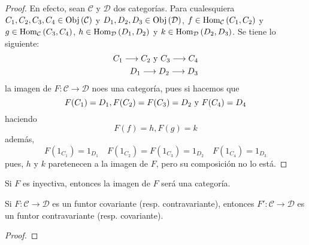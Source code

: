 \documentclass[12pt]{report}
\theoremstyle{largebreak}
\newcommand\cf[3]{\ensuremath{#1:#2\rightarrow#3}}
\newcommand{\Obj}[1]{\ensuremath{\textup{Obj}\left(#1\right)}}
\newcommand{\Hom}[3]{\ensuremath{\textup{Hom}_{#1}\left(#2,#3\right)}}
\begin{document}
    \begin{proof}
        En efecto, sean $\mathcal{C}$ y $\mathcal{D}$ dos categorías. Para cualesquiera $C_1,C_2,C_3,C_4\in\Obj{\mathcal{C}}$ y $D_1,D_2,D_3\in\Obj{\mathcal{D}}$, $f\in\Hom{\mathcal{C}}{C_1}{C_2}$ y $g\in\Hom{\mathcal{C}}{C_3}{C_4}$, $h\in\Hom{\mathcal{D}}{D_1}{D_2}$ y $k\in\Hom{\mathcal{D}}{D_2}{D_3}$. Se tiene lo siguiente:
        \begin{equation*}
            \begin{split}
                C_1\longrightarrow C_2\textup{ y }C_3\longrightarrow C_4\\
                D_1\longrightarrow D_2\longrightarrow D_3\\
            \end{split}
        \end{equation*}
        la imagen de $\cf{F}{\mathcal{C}}{\mathcal{D}}$ noes una categoría, pues si hacemos que
        \begin{equation*}
            F(C_1)=D_1, F(C_2)=F(C_3)=D_2\textup{ y }F(C_4)=D_4
        \end{equation*}
        haciendo
        \begin{equation*}
            F(f)=h,F(g)=k
        \end{equation*}
        además,
        \begin{equation*}
            F(1_{C_1})=1_{D_1}\quad F(1_{C_2})=F(1_{C_3})=1_{D_2}\quad F(1_{C_4})=1_{D_3} 
        \end{equation*}
        pues, $h$ y $k$ paretenecen a la imagen de $F$, pero su composición no lo está.
    \end{proof}

    \begin{obs}
        Si $F$ es inyectiva, entonces la imagen de $F$ será una categoría.
    \end{obs}

    \begin{propo}
        Si $\cf{F}{\mathcal{C}}{\mathcal{D}}$ es un funtor covariante (resp. contravariante), entonces $\cf{F'}{\mathcal{C}}{\mathcal{D}}$ es un funtor contravariante (resp. covariante).
    \end{propo}

    \begin{proof}
        
    \end{proof}
\end{document}
